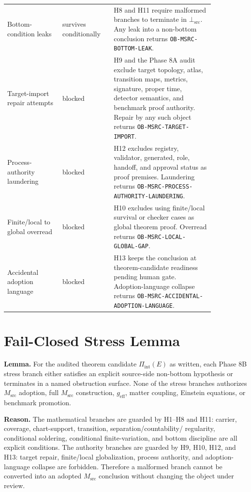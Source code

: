 \documentclass[11pt]{article}
\newcommand{\Msrc}{M_{\mathrm{src}}}
\newcommand{\BottomSrc}{\bot_{\mathrm{src}}}
\begin{document}
\begin{longtable}{p{0.23\linewidth}p{0.20\linewidth}p{0.42\linewidth}}
Bottom-condition leaks &
survives conditionally &
H8 and H11 require malformed branches to terminate in \(\BottomSrc\). Any
leak into a non-bottom conclusion returns \texttt{OB-MSRC-BOTTOM-LEAK}. \\
Target-import repair attempts &
blocked &
H9 and the Phase 8A audit exclude target topology, atlas, transition maps,
metrics, signature, proper time, detector semantics, and benchmark proof
authority. Repair by any such object returns \texttt{OB-MSRC-TARGET-IMPORT}. \\
Process-authority laundering &
blocked &
H12 excludes registry, validator, generated, role, handoff, and approval
status as proof premises. Laundering returns
\texttt{OB-MSRC-PROCESS-AUTHORITY-LAUNDERING}. \\
Finite/local to global overread &
blocked &
H10 excludes using finite/local survival or checker cases as global theorem
proof. Overread returns \texttt{OB-MSRC-LOCAL-GLOBAL-GAP}. \\
Accidental adoption language &
blocked &
H13 keeps the conclusion at theorem-candidate readiness pending human gate.
Adoption-language collapse returns
\texttt{OB-MSRC-ACCIDENTAL-ADOPTION-LANGUAGE}. \\
\bottomrule
\end{longtable}

\section{Fail-Closed Stress Lemma}

\textbf{Lemma.} For the audited theorem candidate \(\Pi_{\mathrm{int}}(E)\) as
written, each Phase 8B stress branch either satisfies an explicit source-side
non-bottom hypothesis or terminates in a named obstruction surface. None of
the stress branches authorizes \(\Msrc\) adoption, full \(\Msrc\)
construction, \(g_{\mathrm{eff}}\), matter coupling, Einstein equations, or
benchmark promotion.

\textbf{Reason.} The mathematical branches are guarded by H1--H8 and H11:
carrier, coverage, chart-support, transition, separation/countability/
regularity, conditional soldering, conditional finite-variation, and bottom
discipline are all explicit conditions. The authority branches are guarded by
H9, H10, H12, and H13: target repair, finite/local globalization, process
authority, and adoption-language collapse are forbidden. Therefore a malformed
branch cannot be converted into an adopted \(\Msrc\) conclusion without
changing the object under review.
\end{document}
